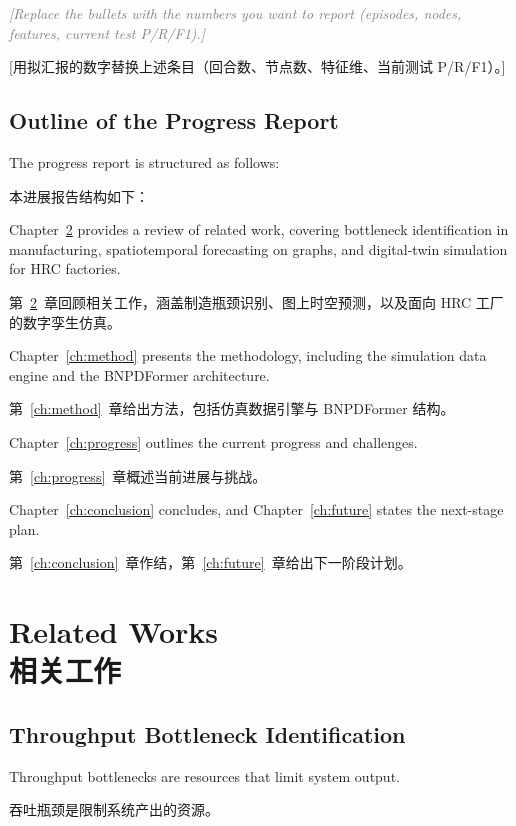 \documentclass[12pt,a4paper,oneside,scheme=plain]{ctexrep}
\newcommand{\fillin}[2]{%
  \par\textit{\textcolor{gray}{[#1]}}\par
  {\small\color{gray}[#2]}\par
  \vspace{0.45em}%
}
\newcommand{\bip}[2]{%
  \par #1\par
  \nobreak\vspace{0.12em}%
  {\small\color{black!62}#2}\par
  \vspace{0.62em}%
}
\begin{document}
\vspace{0.4em}
\fillin
{Replace the bullets with the numbers you want to report (episodes, nodes, features, current test P/R/F1).}
{用拟汇报的数字替换上述条目（回合数、节点数、特征维、当前测试 P/R/F1）。}

\section[Outline of the Progress Report / 报告结构]{Outline of the Progress Report}
\label{sec:outline}

\bip
{The progress report is structured as follows:}
{本进展报告结构如下：}

\bip
{Chapter~\ref{ch:related} provides a review of related work, covering bottleneck identification in manufacturing, spatiotemporal forecasting on graphs, and digital-twin simulation for HRC factories.}
{第~\ref{ch:related}~章回顾相关工作，涵盖制造瓶颈识别、图上时空预测，以及面向 HRC 工厂的数字孪生仿真。}

\bip
{Chapter~\ref{ch:method} presents the methodology, including the simulation data engine and the BNPDFormer architecture.}
{第~\ref{ch:method}~章给出方法，包括仿真数据引擎与 BNPDFormer 结构。}

\bip
{Chapter~\ref{ch:progress} outlines the current progress and challenges.}
{第~\ref{ch:progress}~章概述当前进展与挑战。}

\bip
{Chapter~\ref{ch:conclusion} concludes, and Chapter~\ref{ch:future} states the next-stage plan.}
{第~\ref{ch:conclusion}~章作结，第~\ref{ch:future}~章给出下一阶段计划。}

\chapter[Related Works / 相关工作]{Related Works\\[0.3em]{\large 相关工作}}
\label{ch:related}

\section[Throughput Bottleneck Identification / 吞吐瓶颈识别]{Throughput Bottleneck Identification}
\label{sec:rw-bn}

\bip
{Throughput bottlenecks are resources that limit system output.}
{吞吐瓶颈是限制系统产出的资源。}
\end{document}
